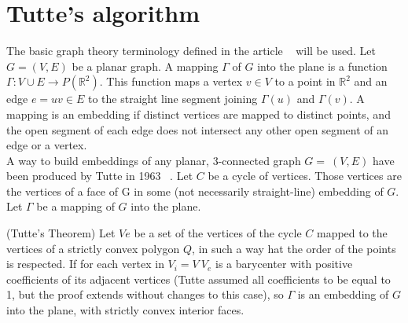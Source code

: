 \section{Tutte's algorithm}

The basic graph theory terminology defined in the article ~\cite{pa, pb}
will be used.  Let $G=(V,E)$ be a planar graph. A mapping $\Gamma$ of $G$
into the plane is a function $\Gamma : V \cup E \to P(\mathbb{R}^2)$. This
function maps a vertex $v \in V$ to a point in $\mathbb{R}^2$ and an edge
$e = uv \in E$ to the straight line segment joining $\Gamma(u)$ and
$\Gamma(v)$.  A mapping is an embedding if distinct vertices are mapped to
distinct points, and the open segment of each edge does not intersect any
other open segment of an edge or a vertex.
\\

A way to build embeddings of any planar, 3-connected graph $G=~(V,E)$ have
been produced by Tutte in 1963 ~\cite{pc}. Let $C$ be a cycle of
vertices. Those vertices are the vertices of a face of G in some (not
necessarily straight-line) embedding of $G$. Let $\Gamma$ be a mapping of
$G$ into the plane.






\begin{theo} \label{theo:box} (Tutte’s Theorem) Let $Ve$ be a set of the
  vertices of the cycle $C$ mapped to the vertices of a strictly convex
  polygon $Q$, in such a way hat the order of the points is respected.  If
  for each vertex in $V_i = V \ V_e$ is a barycenter with positive
  coefficients of its adjacent vertices (Tutte assumed all coefficients to
  be equal to 1, but the proof extends without changes to this case), so
  $\Gamma$ is an embedding of $G$ into the plane, with strictly convex
  interior faces.
\end{theo}

